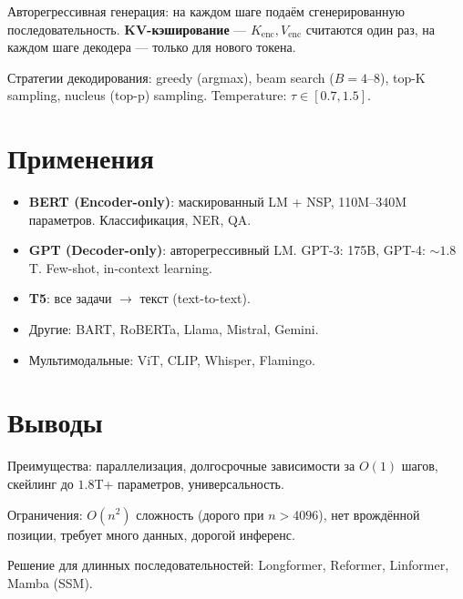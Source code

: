 \documentclass[a4paper,12pt]{article}
\begin{document}
Авторегрессивная генерация: на каждом шаге подаём сгенерированную последовательность. \textbf{KV-кэширование} — $K_{\text{enc}}, V_{\text{enc}}$ считаются один раз, на каждом шаге декодера — только для нового токена.

Стратегии декодирования: greedy (argmax), beam search ($B=4$--8), top-K sampling, nucleus (top-p) sampling. Temperature: $\tau \in [0.7, 1.5]$.

\section{Применения}

\begin{itemize}
    \item \textbf{BERT (Encoder-only)}: маскированный LM + NSP, 110M--340M параметров. Классификация, NER, QA.
    \item \textbf{GPT (Decoder-only)}: авторегрессивный LM. GPT-3: 175B, GPT-4: $\sim 1.8$T. Few-shot, in-context learning.
    \item \textbf{T5}: все задачи $\to$ текст (text-to-text).
    \item Другие: BART, RoBERTa, Llama, Mistral, Gemini.
    \item Мультимодальные: ViT, CLIP, Whisper, Flamingo.
\end{itemize}

\section{Выводы}

Преимущества: параллелизация, долгосрочные зависимости за $O(1)$ шагов, скейлинг до $1.8$T+ параметров, универсальность.

Ограничения: $O(n^2)$ сложность (дорого при $n > 4096$), нет врождённой позиции, требует много данных, дорогой инференс.

Решение для длинных последовательностей: Longformer, Reformer, Linformer, Mamba (SSM).
\end{document}
